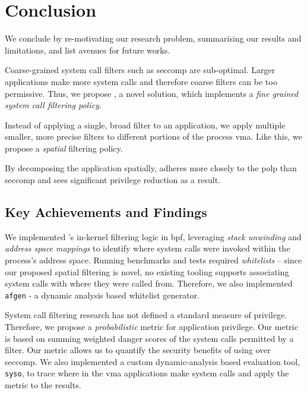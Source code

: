 \section{Conclusion}


\iffalse

\fi


We conclude by re-motivating our research problem, summarising our results and
limitations, and list avenues for future works.

Coarse-grained system call filters such as seccomp are sub-optimal.
Larger applications make more system calls and therefore coarse filters can be
too permissive. Thus, we propose \af, a novel solution, which implements a 
\textit{fine grained system call filtering policy}.

Instead of applying a single, broad filter to an application, we apply multiple
smaller, more precise filters to different portions of the process \ac{vma}.
Like this, we propose a \textit{spatial} filtering policy. 

By decomposing the application spatially, \af adheres more closely to the
\ac{polp} than seccomp and sees significant privilege reduction as a result.

\subsection{Key Achievements and Findings}

We implemented \af's in-kernel filtering logic in \ac{bpf}, leveraging
\textit{stack unwinding} and \textit{address space mappings} to identify where
system calls were invoked within the process's address space. Running benchmarks
and tests required \textit{whitelists} -- since our proposed spatial filtering
is novel, no existing tooling supports associating system calls with where they
were called from. Therefore, we also implemented \texttt{afgen} - a
dynamic analysis based whitelist generator.

System call filtering research has not defined a standard measure of privilege.
Therefore, we propose a \textit{probabilistic} metric for application privilege.
Our metric is based on summing weighted danger scores of the system calls
permitted by a filter. Our metric allows us to quantify the security benefits
of using \af over seccomp. We also implemented a custom dynamic-analysis based
evaluation tool, \texttt{syso}, to trace where in the \ac{vma} applications make 
system calls and apply the metric to the results.


